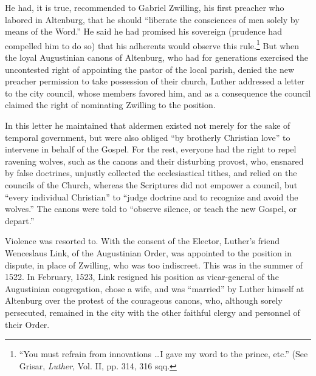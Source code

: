 He had, it is true, recommended to Gabriel Zwilling, his first
preacher who labored in Altenburg, that he should “liberate the consciences
of men solely by means of the Word.” He said he had promised
his sovereign (prudence had compelled him to do so) that his
adherents would observe this rule.\footnote
{“You must refrain from innovations \dots I gave my word to the prince, etc.” (See
Grisar, \textit{Luther}, Vol. II, pp. 314, 316 sqq.}
But when the loyal Augustinian canons of Altenburg, who had for generations
exercised the uncontested right of appointing the pastor of the local parish, denied the
new preacher permission to take possession of their church, Luther
addressed a letter to the city council, whose members favored him, and
as a consequence the council claimed the right of nominating Zwilling
to the position.

In this letter he maintained that aldermen existed not merely for
the sake of temporal government, but were also obliged “by brotherly Christian
love” to intervene in behalf of the Gospel. For the
rest, everyone had the right to repel ravening wolves, such as the
canons and their disturbing provost, who, ensnared by false doctrines,
unjustly collected the ecclesiastical tithes, and relied on the councils
of the Church, whereas the Scriptures did not empower a council, but
“every individual Christian” to “judge doctrine and to recognize
and avoid the wolves.” The canons were told to “observe silence, or
teach the new Gospel, or depart.”

Violence was resorted to. With the consent of the Elector, Luther’s
friend Wenceslaus Link, of the Augustinian Order, was appointed
to the position in dispute, in place of Zwilling, who was too indiscreet.
This was in the summer of 1522. In February, 1523, Link resigned
his position as vicar-general of the Augustinian congregation, chose
a wife, and was “married” by Luther himself at Altenburg over the
protest of the courageous canons, who, although sorely persecuted,
remained in the city with the other faithful clergy and personnel of
their Order.

